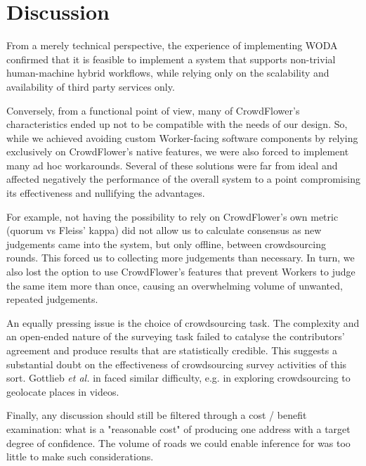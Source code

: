 \section{Discussion}

From a merely technical perspective, the experience of implementing WODA confirmed that it is feasible to implement a system that supports non-trivial human-machine hybrid workflows, while relying only on the scalability and availability of third party services only.

Conversely, from a functional point of view, many of CrowdFlower's characteristics ended up not to be compatible with the needs of our design. So, while we achieved avoiding custom Worker-facing software components by relying exclusively on CrowdFlower's native features, we were also forced to implement many ad hoc workarounds. Several of these solutions were far from ideal and affected negatively the performance of the overall system to a point compromising its effectiveness and nullifying the advantages. 

For example, not having the possibility to rely on CrowdFlower's own metric (quorum vs Fleiss' kappa) did not allow us to calculate consensus as new judgements came into the system, but only offline, between crowdsourcing rounds. This forced us to collecting more judgements than necessary. In turn, we also lost the option to use CrowdFlower's features that prevent Workers to judge the same item more than once, causing an overwhelming volume of unwanted, repeated judgements. 

An equally pressing issue is the choice of crowdsourcing task. The complexity and an open-ended nature of the surveying task failed to catalyse the contributors' agreement and produce results that are statistically credible. This suggests a substantial doubt on the effectiveness of crowdsourcing survey activities of this sort. Gottlieb {\it et al.} in \cite{Gottlieb:2012fh} faced similar difficulty, e.g. in exploring crowdsourcing to geolocate places in videos.

Finally, any discussion should still be filtered through a cost / benefit examination: what is a "reasonable cost" of producing one address with a target degree of confidence. The volume of roads we could enable inference for was too little to make such considerations.

